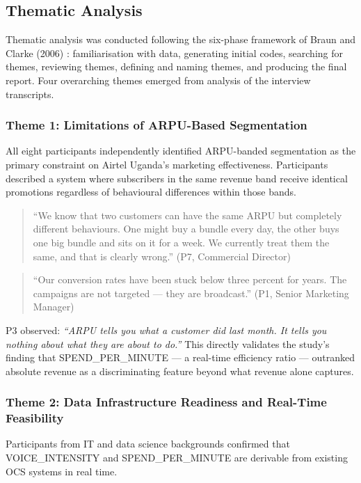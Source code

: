 \subsection{Thematic Analysis}

Thematic analysis was conducted following the six-phase framework of Braun and
Clarke (2006) \cite{ref10}: familiarisation with data, generating initial codes,
searching for themes, reviewing themes, defining and naming themes, and producing
the final report. Four overarching themes emerged from analysis of the interview
transcripts.

\subsubsection{Theme 1: Limitations of ARPU-Based Segmentation}

All eight participants independently identified ARPU-banded segmentation as the
primary constraint on Airtel Uganda's marketing effectiveness. Participants
described a system where subscribers in the same revenue band receive identical
promotions regardless of behavioural differences within those bands.

\begin{quote}
``We know that two customers can have the same ARPU but completely different
behaviours. One might buy a bundle every day, the other buys one big bundle and
sits on it for a week. We currently treat them the same, and that is clearly
wrong.'' (P7, Commercial Director)
\end{quote}

\begin{quote}
``Our conversion rates have been stuck below three percent for years. The campaigns
are not targeted --- they are broadcast.'' (P1, Senior Marketing Manager)
\end{quote}

P3 observed: \textit{``ARPU tells you what a customer did last month. It tells you
nothing about what they are about to do.''} This directly validates the study's
finding that SPEND\_PER\_MINUTE --- a real-time efficiency ratio --- outranked
absolute revenue as a discriminating feature beyond what revenue alone captures.

\subsubsection{Theme 2: Data Infrastructure Readiness and Real-Time Feasibility}

Participants from IT and data science backgrounds confirmed that
VOICE\_INTENSITY and SPEND\_PER\_MINUTE are derivable from existing OCS systems
in real time.

